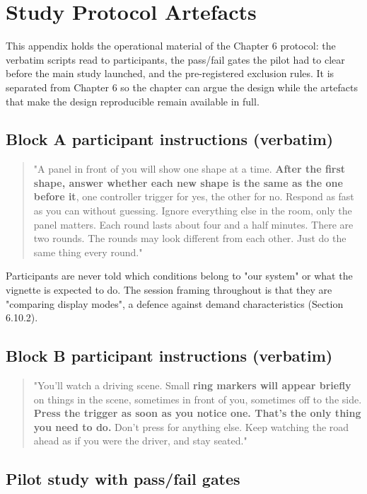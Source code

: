 \chapter{Study Protocol Artefacts}

This appendix holds the operational material of the Chapter 6 protocol: the verbatim scripts read to
participants, the pass/fail gates the pilot had to clear before the main study launched, and the
pre-registered exclusion rules. It is separated from Chapter 6 so the chapter can argue the design
while the artefacts that make the design reproducible remain available in full.


\section{Block A participant instructions (verbatim)}

\begin{quote}
"A panel in front of you will show one shape at a time. \textbf{After the first shape, answer whether
each new shape is the same as the one before it}, one controller trigger for yes, the other for
no. Respond as fast as you can without guessing. Ignore everything else in the room, only the
panel matters. Each round lasts about four and a half minutes. There are two rounds. The rounds
may look different from each other. Just do the same thing every round."
\end{quote}

Participants are never told which conditions belong to "our system" or what the vignette is expected
to do. The session framing throughout is that they are "comparing display modes", a defence against
demand characteristics (Section 6.10.2).


\section{Block B participant instructions (verbatim)}

\begin{quote}
"You'll watch a driving scene. Small \textbf{ring markers will appear briefly} on things in the
scene, sometimes in front of you, sometimes off to the side. \textbf{Press the trigger as soon as
you notice one. That's the only thing you need to do.} Don't press for anything else. Keep watching
the road ahead as if you were the driver, and stay seated."
\end{quote}


\section{Pilot study with pass/fail gates}

